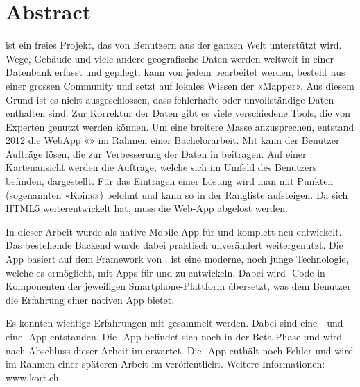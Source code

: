 \chapter*{Abstract}
\thispagestyle{scrheadings}

 ist ein freies Projekt, das von Benutzern aus der ganzen Welt unterstützt wird. 
Wege, Gebäude und viele andere geografische Daten werden weltweit in einer Datenbank erfasst und gepflegt. 
 kann von jedem bearbeitet werden, besteht aus einer grossen Community und setzt auf lokales Wissen der «\gls{Mapper}». 
Aus diesem Grund ist es nicht ausgeschlossen, dass fehlerhafte oder unvollständige Daten enthalten
sind. 
Zur Korrektur der Daten gibt es viele verschiedene Tools, die von Experten genutzt werden können. 
Um eine breitere Masse anzusprechen, entstand 2012 die \gls{WebApp} «\kort{}» im Rahmen einer Bachelorarbeit. 
Mit \kort{} kann der Benutzer Aufträge lösen, die zur Verbesserung der Daten in  beitragen. 
Auf einer Kartenansicht werden die Aufträge, welche sich im Umfeld des Benutzers befinden, dargestellt. 
Für das Eintragen einer Lösung wird man mit Punkten (sogenannten «Koins») belohnt und kann
so in der Rangliste aufsteigen. 
Da sich HTML5 weiterentwickelt hat, muss die Web-App abgelöst werden.

In dieser Arbeit wurde \kort{} als native Mobile App für  und  komplett neu entwickelt. 
Das bestehende \gls{Backend} wurde dabei praktisch unverändert weitergenutzt. 
Die App basiert auf dem  Framework von . 
 ist eine moderne, noch junge Technologie, welche es ermöglicht, mit  Apps für  und  zu entwickeln. 
Dabei wird -Code in Komponenten der jeweiligen Smartphone-Plattform übersetzt, was dem Benutzer die Erfahrung einer nativen App bietet.

Es konnten wichtige Erfahrungen mit  gesammelt werden. 
Dabei sind eine - und eine -App entstanden. 
Die -App befindet sich noch in der Beta-Phase und wird nach Abschluss dieser Arbeit im  erwartet. 
Die -App enthält noch Fehler und wird im Rahmen einer späteren Arbeit im   veröffentlicht.\newline
Weitere Informationen: www.kort.ch. 